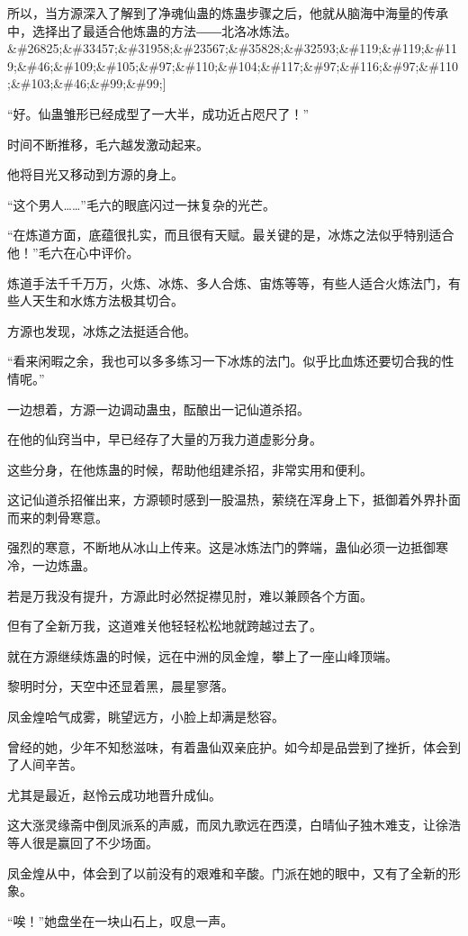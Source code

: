 \begin{this_body}
所以，当方源深入了解到了净魂仙蛊的炼蛊步骤之后，他就从脑海中海量的传承中，选择出了最适合他炼蛊的方法――北洛冰炼法。\&\#26825;\&\#33457;\&\#31958;\&\#23567;\&\#35828;\&\#32593;\&\#119;\&\#119;\&\#119;\&\#46;\&\#109;\&\#105;\&\#97;\&\#110;\&\#104;\&\#117;\&\#97;\&\#116;\&\#97;\&\#110;\&\#103;\&\#46;\&\#99;\&\#99;]

“好。仙蛊雏形已经成型了一大半，成功近占咫尺了！”

时间不断推移，毛六越发激动起来。

他将目光又移动到方源的身上。

“这个男人……”毛六的眼底闪过一抹复杂的光芒。

“在炼道方面，底蕴很扎实，而且很有天赋。最关键的是，冰炼之法似乎特别适合他！”毛六在心中评价。

炼道手法千千万万，火炼、冰炼、多人合炼、宙炼等等，有些人适合火炼法门，有些人天生和水炼方法极其切合。

方源也发现，冰炼之法挺适合他。

“看来闲暇之余，我也可以多多练习一下冰炼的法门。似乎比血炼还要切合我的性情呢。”

一边想着，方源一边调动蛊虫，酝酿出一记仙道杀招。

在他的仙窍当中，早已经存了大量的万我力道虚影分身。

这些分身，在他炼蛊的时候，帮助他组建杀招，非常实用和便利。

这记仙道杀招催出来，方源顿时感到一股温热，萦绕在浑身上下，抵御着外界扑面而来的刺骨寒意。

强烈的寒意，不断地从冰山上传来。这是冰炼法门的弊端，蛊仙必须一边抵御寒冷，一边炼蛊。

若是万我没有提升，方源此时必然捉襟见肘，难以兼顾各个方面。

但有了全新万我，这道难关他轻轻松松地就跨越过去了。

就在方源继续炼蛊的时候，远在中洲的凤金煌，攀上了一座山峰顶端。

黎明时分，天空中还显着黑，晨星寥落。

凤金煌哈气成雾，眺望远方，小脸上却满是愁容。

曾经的她，少年不知愁滋味，有着蛊仙双亲庇护。如今却是品尝到了挫折，体会到了人间辛苦。

尤其是最近，赵怜云成功地晋升成仙。

这大涨灵缘斋中倒凤派系的声威，而凤九歌远在西漠，白晴仙子独木难支，让徐浩等人很是赢回了不少场面。

凤金煌从中，体会到了以前没有的艰难和辛酸。门派在她的眼中，又有了全新的形象。

“唉！”她盘坐在一块山石上，叹息一声。


\end{this_body}
